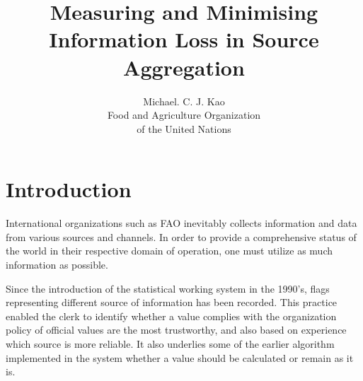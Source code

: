 \documentclass[nojss]{jss}
\title{\bf Measuring and Minimising Information Loss in Source Aggregation}
\author{Michael. C. J. Kao\\ Food and Agriculture Organization \\ of
  the United Nations}
\begin{document}
\section{Introduction}










International organizations such as FAO inevitably collects
information and data from various sources and channels. In order to
provide a comprehensive status of the world in their respective domain
of operation, one must utilize as much information as possible.


Since the introduction of the statistical working system in the
1990's, flags representing different source of information has been
recorded. This practice enabled the clerk to identify whether a value
complies with the organization policy of official values are the most
trustworthy, and also based on experience which source is more
reliable. It also underlies some of the earlier algorithm implemented
in the system whether a value should be calculated or remain as it is.
\end{document}

